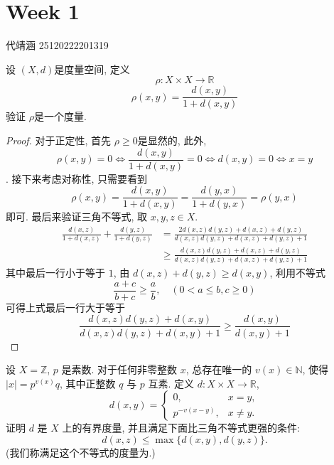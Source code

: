 \documentclass[../main.tex]{subfiles}
\begin{document}
\chapter{ Week 1 }

代靖涵 25120222201319

\begin{exercise}{}{}
    设 \(  \left( X,d \right)   \)是度量空间, 定义 \[
    \rho :X\times X\to \mathbb{R} 
    \] \[
    \rho \left( x,y \right)= \frac{d\left( x,y \right)  }{1+ d\left( x,y \right)  }  
    \]验证 \(  \rho   \)是一个度量.  
\end{exercise}
\begin{proof}
    对于正定性, 首先 \(  \rho \ge 0  \)是显然的, 此外, \[
    \rho \left( x,y \right)= 0\iff \frac{d\left( x,y \right)  }{1+ d\left( x,y \right)  }= 0\iff d\left( x,y \right)= 0\iff x= y   
    \] . 接下来考虑对称性, 只需要看到 \[
    \rho \left( x,y \right)= \frac{d\left( x,y \right)  }{1+ d\left( x,y \right)  }= \frac{d\left( y,x \right)  }{1+ d\left( y,x \right)  }= \rho \left( y,x \right)    
    \]即可. 最后来验证三角不等式, 取 \(  x,y,z \in X  \).  \[
    \begin{aligned}
    \frac{d\left( x,z \right)  }{1+ d\left( x,z \right)  }+ \frac{d\left( y,z \right)  }{1+ d\left( y,z \right)  }&= \frac{2d\left( x,z \right)d\left( y,z \right)  + d\left( x,z \right)+ d\left( y,z \right)    }{d\left( x,z \right)d\left( y,z \right)+ d\left( x,z \right)+ d\left( y,z \right)+ 1      }   \\ 
    & \ge \frac{d\left( x,z \right)d\left( y,z \right)+ d\left( x,z \right)+ d\left( y,z \right)     }{d\left( x,z \right)d\left( y,z \right)+ d\left( x,z \right)+ d\left( y,z \right)+ 1     }  
    \end{aligned}
    \]其中最后一行小于等于 \(  1  \), 由 \(  d\left( x,z \right)+ d\left( y,z \right)\ge d\left( x,y \right)     \), 利用不等式 \[
    \frac{a+ c }{b+ c }\ge \frac{a }{b },\quad (0< a\le b  , c\ge 0)
    \]可得上式最后一行大于等于 \[
    \frac{d\left( x,z \right)d\left( y,z \right)+ d\left( x,y \right)    }{d\left( x,z \right)d\left( y,z \right)+ d\left( x,y \right)+ 1    } \ge \frac{d\left( x,y \right)  }{d\left( x,y \right)+ 1  }  
    \]  
\end{proof}

\begin{exercise}{}{}
设 $X = \mathbb{Z}$, $p$ 是素数. 对于任何非零整数 $x$, 总存在唯一的 $v(x) \in \mathbb{N}$,
使得 $|x| = p^{v(x)}q$, 其中正整数 $q$ 与 $p$ 互素. 定义 $d: X \times X \to \mathbb{R}$,
\[ d(x, y) = \begin{cases} 0, & x = y, \\ p^{-v(x-y)}, & x \neq y. \end{cases} \]
证明 $d$ 是 $X$ 上的有界度量, 并且满足下面比三角不等式更强的条件:
\[ d(x, z) \le \max\{d(x, y), d(y, z)\}. \]
(我们称满足这个不等式的度量为.)
\end{exercise}
\end{document}
